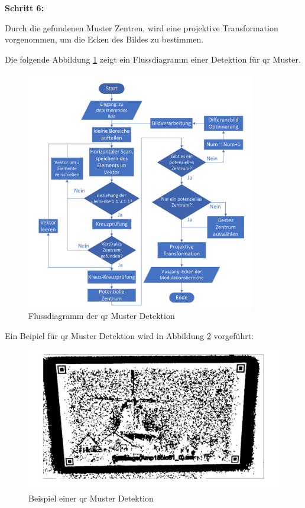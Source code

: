 \textbf{Schritt 6:}

Durch die gefundenen Muster Zentren, wird eine projektive Transformation vorgenommen, um die Ecken des Bildes zu bestimmen.


Die folgende Abbildung \ref{fig:FlussdiagrammQRMuster} zeigt ein Flussdiagramm einer Detektion für \gls{qr} Muster.

\begin{figure}[htb]
 \centering 
 \includegraphics[keepaspectratio,width=0.90\textwidth]{images/3_Ersteverfahren/QRMuster/QR_flussdiagramm.pdf}
 \caption{Flussdiagramm der \gls{qr} Muster Detektion}
 \label{fig:FlussdiagrammQRMuster}
\end{figure}

\newpage
Ein Beipiel für \gls{qr} Muster Detektion wird in Abbildung \ref{fig:QRMusterBeispiel} vorgeführt:

\begin{figure}[htb]
 \centering 
 \includegraphics[keepaspectratio,width=1.0\textwidth]{images/3_Ersteverfahren/QRMuster/QR_Patterndetektion.pdf}
 \caption{Beispiel einer \gls{qr} Muster Detektion}
 \label{fig:QRMusterBeispiel}
\end{figure}